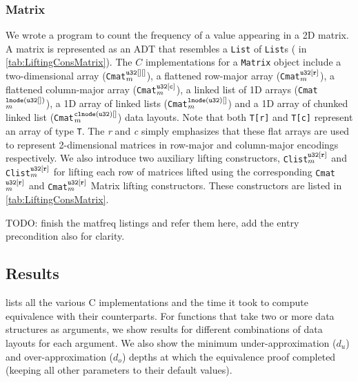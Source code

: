 \subsubsection{Matrix} We wrote a
\SpecL{} program to count the frequency of a value appearing in a 2D matrix.
A matrix is represented as an ADT that resembles a {\tt List} of {\tt List}s ( in \cref{tab:LiftingConsMatrix}).
The $C$ implementations for a {\tt Matrix} object include
a two-dimensional array ({\tt Cmat}$^{\tt u32[][]}_m$), a flattened row-major array ({\tt Cmat}$^{\tt u32[r]}_m$),
a flattened column-major array ({\tt Cmat}$^{\tt u32[c]}_m$), a linked list of 1D arrays ({\tt Cmat}$^{\tt lnode(u32[])}_m$),
a 1D array of linked lists ({\tt Cmat}$^{\tt lnode(u32)[]}_m$) and a 1D array of chunked linked list ({\tt Cmat}$^{\tt clnode(u32)[]}_m$)
data layouts. Note that both {\tt T[r]} and {\tt T[c]} represent an array of type {\tt T}. The {\em r} and {\em c} simply
emphasizes that these flat arrays are used to represent 2-dimensional matrices in row-major and column-major encodings
respectively. We also introduce two auxiliary lifting constructors, {\tt Clist}$_m^{\tt u32[r]}$ and {\tt Clist}$_m^{\tt u32[r]}$
for lifting each row of matrices lifted using the corresponding {\tt Cmat}$_m^{\tt u32[r]}$ and {\tt Cmat}$_m^{\tt u32[r]}$ Matrix lifting
constructors. These constructors are listed in \cref{tab:LiftingConsMatrix}.

TODO: finish the matfreq listings and refer them here, add the entry precondition also for clarity.





\subsection{Results}
 lists all the various C implementations and the time it took
to compute equivalence with their \SpecL{} counterparts. For functions that
take two or more data structures as arguments, we show
results for different combinations of data layouts for each argument.
We also show the minimum under-approximation ($d_u$) and over-approximation ($d_o$) depths
at which the equivalence proof completed (keeping all other parameters to their
default values).

